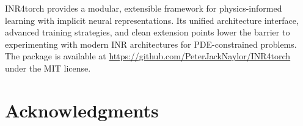 \documentclass[11pt,a4paper]{article}
\begin{document}
INR4torch provides a modular, extensible framework for physics-informed learning with implicit neural representations. Its unified architecture interface, advanced training strategies, and clean extension points lower the barrier to experimenting with modern INR architectures for PDE-constrained problems. The package is available at \url{https://github.com/PeterJackNaylor/INR4torch} under the MIT license.

\section*{Acknowledgments}




\end{document}
